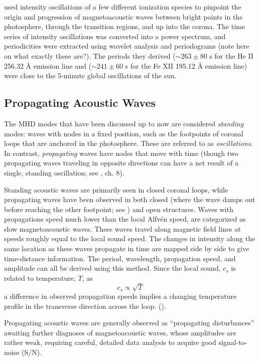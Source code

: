 \documentclass[preprint2]{aastex}
\begin{document}
\cite{acoustic_2} used intensity oscillations of a few different ionization
species to pinpoint the origin and progression of magnetoacoustic waves
between bright points in the photosphere, through the transition regions,
and up into the corona. The time series of intensity oscillations was
converted into a power spectrum, and periodicities were extracted using
wavelet analysis and periodograms (note here on what exactly these are?).
The periods they derived
($\sim 263 \pm 80$ s for the He II 256.32 \AA{} emission line and
($\sim 241 \pm 60$ s for the Fe XII 195.12 \AA{}  emission line)
were close to the 5-minute global oscillations of the sun.

\subsection{Propagating Acoustic Waves}
The MHD modes that have been discussed up to now are considered
\emph{standing} modes: waves with nodes in a fixed
position, such as the footpoints of coronal loops that are anchored in
the photosphere. These are referred to as \emph{oscillations}.
In contrast, \emph{propagating} waves have nodes that move with time
(though two propagating waves traveling in opposite directions can
have a net result of a single, standing oscillation; see \cite{Asc},
ch. 8).

Standing acoustic waves are primarily seen in closed coronal
loops, while propagating waves have been observed in both closed
(where the wave damps out before reaching the other footpoint;
see \cite{acoustic_1})
and open structures.
Waves with propagations speed much lower than the
local Alfv\'en speed, are categorized as slow magnetoacoustic waves.
These waves travel along magnetic field lines at speeds roughly equal to
the local sound speed.
The changes in intensity along the same location as these waves
propagate in time are mapped side by side to give time-distance
information. The period, wavelength, propagation speed, and amplitude
can all be derived using this method.
Since the local sound, $c_{s}$ is related to temperature, $T$, as
\begin{equation}\label{sound-temp}
 c_{s} \propto \sqrt{T}
\end{equation}
a difference in observed propagation speeds implies a changing
temperature profile in the transverse direction across the loop.
(\cite{Nak}).

Propagating acoustic waves are generally observed as ``propagating
disturbances'' awaiting further diagnoses of magnetoacoustic waves,
whose amplitudes are rather weak, requiring careful, detailed data
analysis to acquire good signal-to-noise (S/N).
\end{document}
